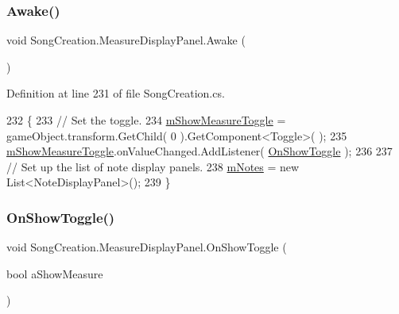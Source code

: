\subsubsection{\texorpdfstring{Awake()}{Awake()}}
{\footnotesize\ttfamily void Song\+Creation.\+Measure\+Display\+Panel.\+Awake (\begin{DoxyParamCaption}{ }\end{DoxyParamCaption})\hspace{0.3cm}{\ttfamily [private]}}



Definition at line 231 of file Song\+Creation.\+cs.


\begin{DoxyCode}
232         \{
233             \textcolor{comment}{// Set the toggle.}
234             \hyperlink{class_song_creation_1_1_measure_display_panel_abe01653518d60c345faa462ccf979a55}{mShowMeasureToggle} = gameObject.transform.GetChild( 0 ).GetComponent<Toggle>(
      );
235             \hyperlink{class_song_creation_1_1_measure_display_panel_abe01653518d60c345faa462ccf979a55}{mShowMeasureToggle}.onValueChanged.AddListener( 
      \hyperlink{class_song_creation_1_1_measure_display_panel_a0ade5469a803bafc5a87595d0a2fef88}{OnShowToggle} );
236 
237             \textcolor{comment}{// Set up the list of note display panels.}
238             \hyperlink{class_song_creation_1_1_measure_display_panel_a096dfc8481f3defcdcb57bfc140ac953}{mNotes} = \textcolor{keyword}{new} List<NoteDisplayPanel>();
239         \}
\end{DoxyCode}
\mbox{\label{class_song_creation_1_1_measure_display_panel_a0ade5469a803bafc5a87595d0a2fef88}} 
\subsubsection{\texorpdfstring{On\+Show\+Toggle()}{OnShowToggle()}}
{\footnotesize\ttfamily void Song\+Creation.\+Measure\+Display\+Panel.\+On\+Show\+Toggle (\begin{DoxyParamCaption}\item[{bool}]{a\+Show\+Measure }\end{DoxyParamCaption})}



